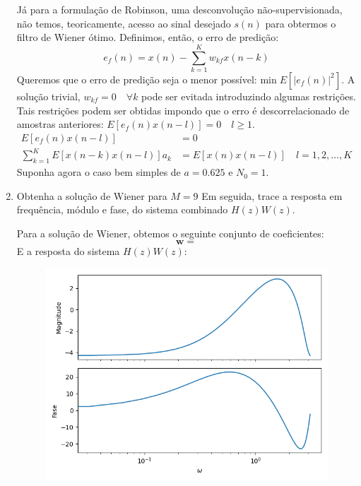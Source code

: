 \begin{enumerate}[label={\bf \roman*:},series=exerc,align=left]
    Já para a formulação de Robinson, uma desconvolução não-supervisionada, não temos, teoricamente, acesso ao sinal desejado $s(n)$ para obtermos o filtro de Wiener ótimo.
    Definimos, então, o erro de predição:
    \begin{equation*}
        e_f(n) = x(n) - \sum_{k=1}^{K}w_{kf} x(n-k)
    \end{equation*}
    Queremos que o erro de predição seja o menor possível: $\text{min} \; E[|e_f(n)|^2]$.
    A solução trivial, $w_{kf} = 0 \quad \forall k$ pode ser evitada introduzindo algumas restrições.
    Tais restrições podem ser obtidas impondo que o erro é descorrelacionado de amostras anteriores: $E[e_f(n)x(n-l)] = 0 \quad l \geq 1$.
    \begin{align*}
        E[e_f(n)x(n-l)] &= 0 \\
        \sum_{k=1}^{K} E[x(n-k)x(n-l)] a_k &= E[x(n)x(n-l)] \quad l = 1, 2, \dots, K
    \end{align*}
    Suponha agora o caso bem simples de $a = 0.625$ e $N_0 = 1$.
    \item Obtenha a solução de Wiener para $M = 9$
    Em seguida, trace a resposta em frequência, módulo e fase, do sistema combinado $H(z)W(z)$.

    Para a solução de Wiener, obtemos o seguinte conjunto de coeficientes:
    \begin{equation*} \mathbf{w} =  \end{equation*}
    E a resposta do sistema $H(z)W(z)$:
    \begin{figure}[h!]
        \centering
        \includegraphics{../img/03/Wiener_Bode_0_625.png}
    \end{figure}


\end{enumerate}
